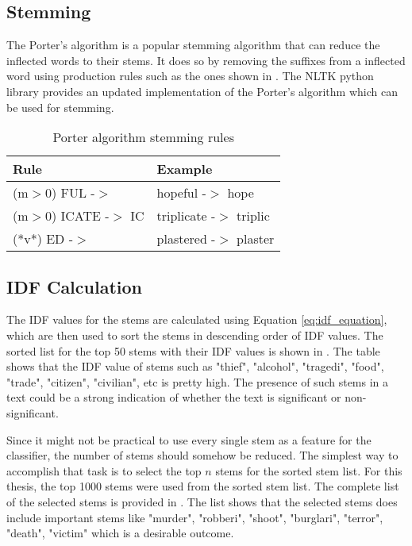 \subsection{Stemming}
The Porter's algorithm\cite{porter1980algorithm} is a popular stemming algorithm that can reduce the inflected words to their stems. It does so by removing the suffixes from a inflected word using production rules such as the ones shown in . The NLTK python library provides an updated implementation of the Porter's algorithm which can be used for stemming.

\begin{table}
    \centering
    \caption{Porter algorithm stemming rules}
    \label{tbl:porter_algo}
    \begin{tabular}{p{4cm}p{4cm}}
    \toprule
    Rule&Example \\
    \midrule
    (m$>$0) FUL -$>$  &  hopeful -$>$ hope \\
    (m$>$0) ICATE -$>$ IC  & triplicate -$>$ triplic \\
    (*v*) ED -$>$ & plastered -$>$ plaster \\
    \bottomrule
    \end{tabular}
\end{table}

\subsection{IDF Calculation}
The IDF values for the stems are calculated using Equation \eqref{eq:idf_equation}, which are then used to sort the stems in descending order of IDF values. The sorted list for the top 50 stems with their IDF values is shown in . The table shows that the IDF value of stems such as "thief", "alcohol", "tragedi", "food", "trade", "citizen", "civilian", etc is pretty high. The presence of such stems in a text could be a strong indication of whether the text is significant or non-significant.

Since it might not be practical to use every single stem as a feature for the classifier, the number of stems should somehow be reduced. The simplest way to accomplish that task is to select the top $n$ stems for the sorted stem list. For this thesis, the top 1000 stems were used from the sorted stem list. The complete list of the selected stems is provided in . The list shows that the selected stems does include important stems like "murder", "robberi", "shoot", "burglari", "terror", "death", "victim" which is a desirable outcome.


